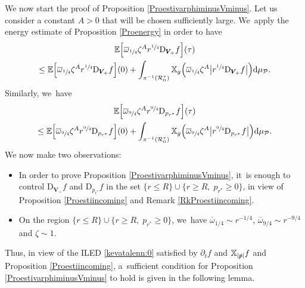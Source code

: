 \documentclass[10pt]{amsart}
\theoremstyle{plain}
\theoremstyle{definition}
\newcommand\z{{\zeta}}
\newcommand\T{{\mathbb{X}}}
\newcommand\dr{{\mathrm{d}}}
\begin{document}
We now start the proof of Proposition \ref{ProestivarphiminusVminus}. Let us consider a constant $A>0$ that will be chosen sufficiently large. We~apply the energy estimate of Proposition \ref{Proenergy} in order to have
\begin{multline*}
\mathbb{E} \Bigl[ \overline{\omega}_{\sfrac{1}{4}} \z^A r^{\sfrac{1}{4}}\mathrm{D}_{\pmb{V}_{\!+}} f \Bigr](\tau)\\
\leq \mathbb{E} \Bigl[ \overline{\omega}_{\sfrac{1}{4}} \z^A r^{\sfrac{1}{4}}\mathrm{D}_{\pmb{V}_{\!+}} f \Bigr](0)+\int_{\pi^{-1} (\mathcal{R}_0^\tau)} \T_g \Bigl(\overline{\omega}_{\sfrac{1}{4}} \z^A \big| r^{\sfrac{1}{4}}\mathrm{D}_{\pmb{V}_{\!+}} f \big| \Bigr) \dr \mu_{\mathcal{P}}.
\end{multline*}
Similarly, we~have
\begin{multline*}
\mathbb{E} \Bigl[\overline{\omega}_{\sfrac{9}{4}} \z^A r^{\sfrac{9}{4}}\mathrm{D}_{p_{r^*}} f \Bigr](\tau)\\
\leq \mathbb{E} \Bigl[ \overline{\omega}_{\sfrac{9}{4}} \z^A r^{\sfrac{9}{4}}\mathrm{D}_{p_{r^*}} f \Bigr](0)+\int_{\pi^{-1} (\mathcal{R}_0^\tau)} \T_g \Bigl(\overline{\omega}_{\sfrac{9}{4}} \z^A \big| r^{\sfrac{9}{4}}\mathrm{D}_{p_{r^*}} f \big| \Bigr) \dr \mu_{\mathcal{P}}.
\end{multline*}
We now make two observations:
\begin{itemize}
\item In order to prove Proposition \ref{ProestivarphiminusVminus}, it~is enough to control $\mathrm{D}_{\pmb{V}_{\!+}} f$ and $\mathrm{D}_{p_{r^*}}f$ in the set $\{ r \leq R\} \cup \{ r \geq R, \; p_{r^*} \geq 0 \}$, in view of Proposition \ref{Proestiincoming} and Remark \ref{RkProestiincoming}.
\item On the region $\{ r \leq R\} \cup \{ r \geq R, \; p_{r^*} \geq 0 \}$, we~have $\overline{\omega}_{1/4} \sim r^{-1/4}$, $\overline{\omega}_{9/4} \sim r^{-9/4}$ and $\z \sim 1$.
\end{itemize}
Thus, in view of the ILED \eqref{kevatalenn:0} satisfied by $\partial_t f$ and $\T_{|\slashed{p}|} f$ and Proposition \ref{Proestiincoming}, a~sufficient condition for Proposition \ref{ProestivarphiminusVminus} to hold is given in the following lemma.
\end{document}
